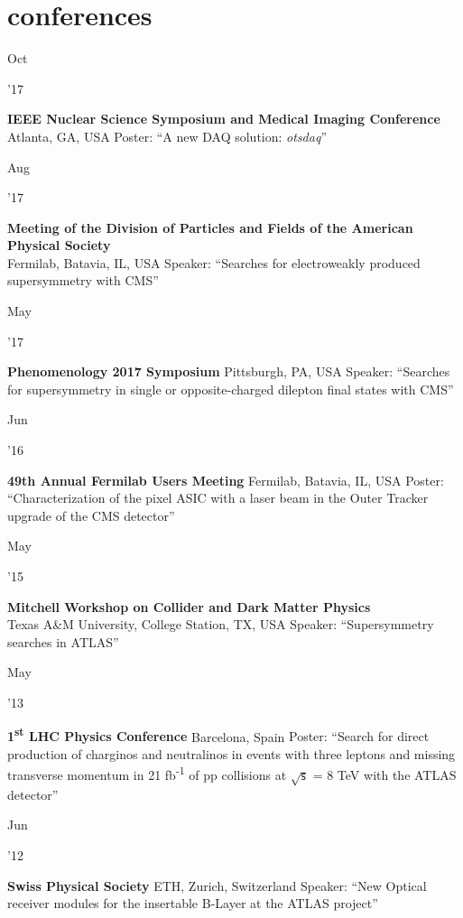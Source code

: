 \documentclass[]{cv} %
\begin{document}
\section{conferences}

\begin{entrylist}

  \entrytwo
  {\parbox[t]{\parboxWidthOne}{Oct}\parbox[t]{\parboxWidthTwo}{\hfill '17}}
  {\textbf{IEEE Nuclear Science Symposium and Medical Imaging Conference}}
  {Atlanta, GA, USA}
  {Poster: ``A new DAQ solution: \textit{otsdaq}''}

  \entry
  {\parbox[t]{\parboxWidthOne}{Aug}\parbox[t]{\parboxWidthTwo}{\hfill '17}}
  {\textbf{Meeting of the Division of Particles and Fields of the American
  Physical Society}\\}
  {Fermilab, Batavia, IL, USA}
  {Speaker: ``Searches for electroweakly produced supersymmetry with CMS''}

  \entry
  {\parbox[t]{\parboxWidthOne}{May}\parbox[t]{\parboxWidthTwo}{\hfill '17}}
  {\textbf{Phenomenology 2017 Symposium}}
  {Pittsburgh, PA, USA}
  {Speaker: ``Searches for supersymmetry in single or opposite-charged dilepton final states with CMS''}

  \entry
  {\parbox[t]{\parboxWidthOne}{Jun}\parbox[t]{\parboxWidthTwo}{\hfill '16}}
  {\textbf{49th Annual Fermilab Users Meeting}}
  {Fermilab, Batavia, IL, USA}
  {Poster: ``Characterization of the pixel ASIC with a laser beam in the Outer Tracker upgrade of the CMS detector''}

  \entry
  {\parbox[t]{\parboxWidthOne}{May}\parbox[t]{\parboxWidthTwo}{\hfill '15}}
  {\textbf{Mitchell Workshop on Collider and Dark Matter Physics}\\}
  {Texas A\&M University, College Station, TX, USA}
  {Speaker: ``Supersymmetry searches in ATLAS''}

  \entry
  {\parbox[t]{\parboxWidthOne}{May}\parbox[t]{\parboxWidthTwo}{\hfill '13}}
  {\textbf{1\textsuperscript{st} LHC Physics Conference}}
  {Barcelona, Spain}
  {Poster: ``Search for direct production of charginos and neutralinos in events with three
    leptons and missing transverse momentum in 21 fb\textsuperscript{-1} of pp collisions at $\sqrt{\mathsf{s}}$ = 8 TeV with the ATLAS
  detector''}

  \entry
  {\parbox[t]{\parboxWidthOne}{Jun}\parbox[t]{\parboxWidthTwo}{\hfill '12}}
  {\textbf{Swiss Physical Society}}
  {ETH, Zurich, Switzerland}
  {Speaker: ``New Optical receiver modules for the insertable B-Layer at the ATLAS project''}


\end{entrylist}
\end{document}
